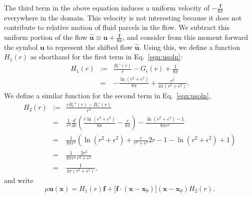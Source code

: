 \documentclass[12pt]{article}
\newcommand{\bees}[1]{\begin{equation*} #1 \end{equation*}}
\newcommand{\baas}[1]{\begin{eqnarray*} #1 \end{eqnarray*}}
\newcommand{\dd}[2]{\ensuremath{\frac{d #1}{d #2}}}
\newcommand{\bx}{{\mathbf x}}
\newcommand{\bu}{{\mathbf u}}
\newcommand{\ff}{{\mathbf f}}
\newcommand{\Ge}{G_\epsilon}
\newcommand{\Be}{B_\epsilon}
\newcommand{\eps}{\epsilon}
\begin{document}
The third term in the above equation induces a uniform velocity of $- \frac{\ff}{8\pi}$ everywhere in the domain. This velocity is not interesting because it does not contribute to relative motion of fluid parcels in the flow. We subtract this uniform portion of the flow $ \hat{\bu} \equiv \bu +\frac{\ff}{8\pi}$, and consider from this moment forward the symbol $\bu$ to represent the shifted flow $\hat{\bu}$. Using this, we define a function $H_1(r)$ as shorthand for the first term in Eq.~\eqref{eqn:usoln}:
\baas{
H_1(r) &:=& \frac{\Be'(r)}{r} - \Ge(r) + \frac{1}{8\pi} \\
&=& - \frac{\ln(r^2 + \eps^2)}{8\pi}  + \frac{\eps^2}{4\pi(r^2 + \eps^2)}.
}
We define a similar function for the second term in Eq.~\eqref{eqn:usoln},
\baas{
H_2(r) &:=& \frac{r\Be''(r) - \Be'(r)}{r^3} \\
&=& \frac{1}{r^2} \dd{}{r}\left( \frac{r \ln(r^2 + \eps^2)}{8\pi} - \frac{r}{8\pi} \right) - \frac{\ln(r^2 + \eps^2) - 1}{8\pi r^2} \\
&=& \frac{1}{8\pi r^2} \left( \ln(r^2 + \eps^2) + \frac{r}{r^2 + \eps^2}2r - 1 - \ln(r^2 + \eps^2) + 1 \right) \\
&=& \frac{1}{8\pi r^2}\frac{2r^2}{r^2 + \eps^2} \\
&=& \frac{1}{4\pi (r^2 + \eps^2) },
}
and write
\bees{
\mu\bu(\bx) = H_1(r)\ff + \big[\ff \cdot (\bx -\bx_0)\big](\bx -\bx_0)H_2(r).
}
\end{document}
